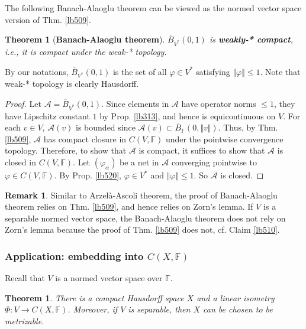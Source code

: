 \documentclass[12pt,b5paper,notitlepage]{article}
\theoremstyle{definition}
\newtheorem{rem}[df]{Remark}
\theoremstyle{plain}
\newtheorem{thm}[df]{Theorem}
\newcommand{\ovl}{\overline}
\newcommand{\scr}{\mathscr}
\newcommand{\Fbb}{\mathbb F}
\numberwithin{equation}{section}
\begin{document}
The following Banach-Alaoglu theorem can be viewed as the normed vector space version of Thm. \ref{lb509}.

\begin{thm}[\textbf{Banach-Alaoglu theorem}]\label{lb519}
$\ovl B_{V^*}(0,1)$ is \textbf{weakly-* compact},  i.e., it is compact under the weak-* topology. 
\end{thm}

By our notations, $\ovl B_{V^*}(0,1)$ is the set of all $\varphi\in V^*$ satisfying $\Vert\varphi\Vert\leq 1$. Note that weak-* topology is clearly Hausdorff.

\begin{proof}
Let $\scr A=\ovl B_{V^*}(0,1)$. Since elements in $\scr A$ have operator norms $\leq 1$, they have Lipschitz constant $1$ by Prop. \ref{lb313}, and hence is equicontinuous on $V$. For each $v\in V$, $\scr A(v)$ is bounded since $\scr A(v)\subset\ovl B_\Fbb(0,\Vert v\Vert)$. Thus, by Thm. \ref{lb509}, $\scr A$ has compact closure in $C(V,\Fbb)$ under the pointwise convergence topology. Therefore, to show that $\scr A$ is compact, it suffices to show that $\scr A$ is closed in $C(V,\Fbb)$. Let $(\varphi_\alpha)$ be a net in $\scr A$ converging pointwise to $\varphi\in C(V,\Fbb)$. By Prop. \ref{lb520}, $\varphi\in V^*$ and $\Vert\varphi\Vert\leq 1$. So $\scr A$ is closed.
\end{proof}


\begin{rem}\label{lb525}
Similar to Arzel\`a-Ascoli theorem, the proof of Banach-Alaoglu theorem relies on Thm. \ref{lb509}, and hence relies on Zorn's lemma. If $V$ is a separable normed vector space, the Banach-Alaoglu theorem does not rely on Zorn's lemma because the proof of Thm. \ref{lb509} does not, cf. Claim \ref{lb510}.
\end{rem}







\subsubsection{Application: embedding into $C(X,\Fbb)$}

Recall that $V$ is a normed vector space over $\Fbb$.





\begin{thm}\label{lb521}
There is a compact Hausdorff space $X$ and a linear isometry $\Phi:V\rightarrow C(X,\Fbb)$. Moreover, if $V$ is separable, then $X$ can be chosen to be metrizable. 
\end{thm}
\end{document}
